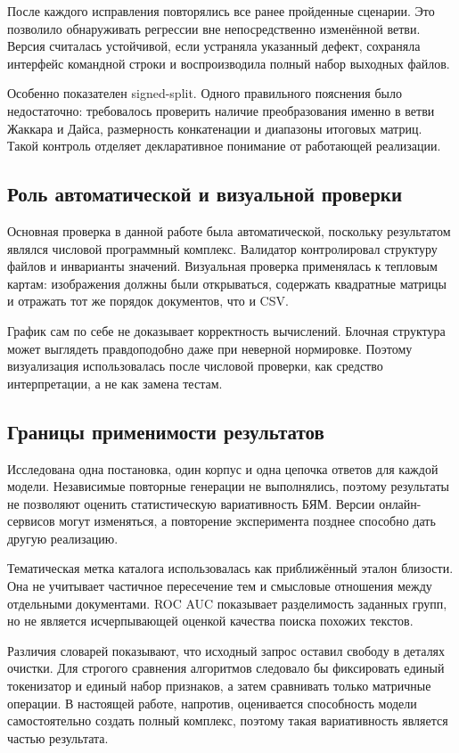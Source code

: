 \documentclass[a4paper,12pt]{extreport}
\begin{document}
После каждого исправления повторялись все ранее пройденные сценарии. Это позволило обнаруживать регрессии вне непосредственно изменённой ветви. Версия считалась устойчивой, если устраняла указанный дефект, сохраняла интерфейс командной строки и воспроизводила полный набор выходных файлов.

Особенно показателен signed-split. Одного правильного пояснения было недостаточно: требовалось проверить наличие преобразования именно в ветви Жаккара и Дайса, размерность конкатенации и диапазоны итоговых матриц. Такой контроль отделяет декларативное понимание от работающей реализации.

\subsection{Роль автоматической и визуальной проверки}

Основная проверка в данной работе была автоматической, поскольку результатом являлся числовой программный комплекс. Валидатор контролировал структуру файлов и инварианты значений. Визуальная проверка применялась к тепловым картам: изображения должны были открываться, содержать квадратные матрицы и отражать тот же порядок документов, что и CSV.

График сам по себе не доказывает корректность вычислений. Блочная структура может выглядеть правдоподобно даже при неверной нормировке. Поэтому визуализация использовалась после числовой проверки, как средство интерпретации, а не как замена тестам.

\subsection{Границы применимости результатов}

Исследована одна постановка, один корпус и одна цепочка ответов для каждой модели. Независимые повторные генерации не выполнялись, поэтому результаты не позволяют оценить статистическую вариативность БЯМ. Версии онлайн-сервисов могут изменяться, а повторение эксперимента позднее способно дать другую реализацию.

Тематическая метка каталога использовалась как приближённый эталон близости. Она не учитывает частичное пересечение тем и смысловые отношения между отдельными документами. ROC AUC показывает разделимость заданных групп, но не является исчерпывающей оценкой качества поиска похожих текстов.

Различия словарей показывают, что исходный запрос оставил свободу в деталях очистки. Для строгого сравнения алгоритмов следовало бы фиксировать единый токенизатор и единый набор признаков, а затем сравнивать только матричные операции. В настоящей работе, напротив, оценивается способность модели самостоятельно создать полный комплекс, поэтому такая вариативность является частью результата.
\end{document}
